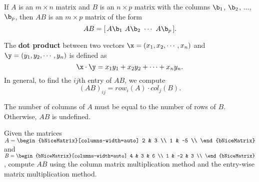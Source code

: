 \begin{definition}
  \label{def:column_matrix_multiplication}

  If $A$ is an $m \times n$ matrix and $B$ is an $n \times p$ matrix with the
  columns $\b_1$, $\b_2$, $\dots$, $\b_p$, then $AB$ is an $m \times p$ matrix
  of the form
  \[%
    AB = [\,A\b_1~A\b_2~\cdots~A\b_p\,]
  .\]%
\end{definition}

\begin{definition}
  \label{def:entry_wise_matrix_multiplication}

  The \textbf{dot product} between two vectors $\x = (x_1, x_2, \cdots, x_n)$
  and $\y = (y_1, y_2, \cdots, y_n)$ is defined as
  \[%
    \x \cdot \y = x_1y_1 + x_2y_2 + \cdots + x_ny_n
  .\]%
  In general, to find the $ij$th entry of $AB$, we compute
  \[%
    (AB)_{ij} = row_i(A) \cdot col_j(B)
  .\]%
\end{definition}

\begin{purpleframe}
  \label{prpl:undefined_matrix_multiplication}

  The number of columns of $A$ must be equal to the number of rows of $B$.
  Otherwise, $AB$ is undefined.
\end{purpleframe}

\begin{question}
  \label{qst:column_matrix_multiplication}

  Given the matrices $A =
  \begin{bNiceMatrix}[columns-width=auto]
    2 & 3 \\
    1 & -5 \\
  \end{bNiceMatrix}$
  and $B = \begin{bNiceMatrix}[columns-width=auto]
    4 & 3 & 6 \\
    1 & -2 & 3 \\
  \end{bNiceMatrix}$, compute $AB$ using the column matrix multiplication method
  and the entry-wise matrix multiplication method.
\end{question}

